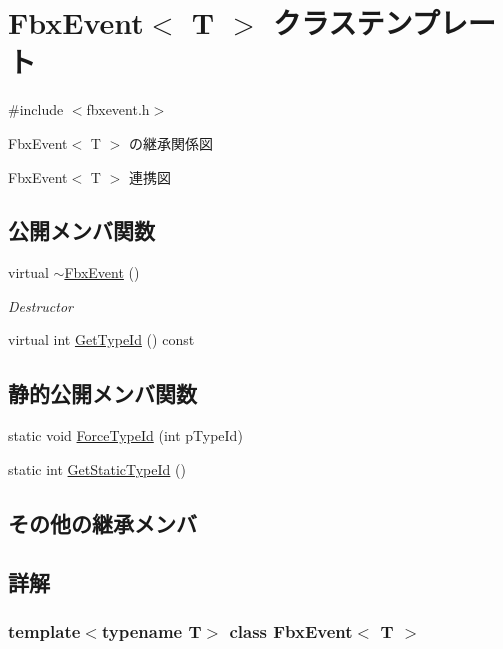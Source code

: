 \hypertarget{class_fbx_event}{}\section{Fbx\+Event$<$ T $>$ クラステンプレート}
\label{class_fbx_event}


{\ttfamily \#include $<$fbxevent.\+h$>$}



Fbx\+Event$<$ T $>$ の継承関係図


Fbx\+Event$<$ T $>$ 連携図
\subsection*{公開メンバ関数}
\begin{DoxyCompactItemize}
\item 
virtual \hyperlink{class_fbx_event_a57f0d84cc53c4d29bcff0dceb091eed4}{$\sim$\+Fbx\+Event} ()
\begin{DoxyCompactList}\small\item\em Destructor \end{DoxyCompactList}\item 
virtual int \hyperlink{class_fbx_event_a96ae7ea5ee46f040f6493f6acecd5bba}{Get\+Type\+Id} () const
\end{DoxyCompactItemize}
\subsection*{静的公開メンバ関数}
\begin{DoxyCompactItemize}
\item 
static void \hyperlink{class_fbx_event_a0e3fe581649a5917208561a03ad61295}{Force\+Type\+Id} (int p\+Type\+Id)
\item 
static int \hyperlink{class_fbx_event_a9f2329973ee8cb60860d004cc2823c70}{Get\+Static\+Type\+Id} ()
\end{DoxyCompactItemize}
\subsection*{その他の継承メンバ}


\subsection{詳解}
\subsubsection*{template$<$typename T$>$\newline
class Fbx\+Event$<$ T $>$}

